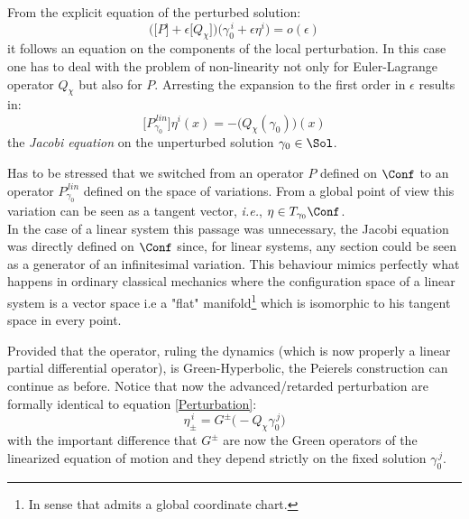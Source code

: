 \documentclass[Main]{subfiles}
\begin{document}
		\vspace{2mm}
		From the explicit equation of the perturbed solution: 
		\begin{displaymath}
			\biggr(\big[P\big] + \epsilon\big[Q_\chi\big] \biggr) \big(\gamma_0^{\,i}+\epsilon \eta^i \big) = o(\epsilon)
		\end{displaymath}
		it follows an equation on the components of the local perturbation.
		In  this case one has to deal with the problem of non-linearity not only for Euler-Lagrange operator $Q_\chi$ but also for $P$.
		Arresting the expansion to the first order in $\epsilon$ results in:
		\begin{equation}\label{PeierlJacobiEqNonLin}
			\biggr[P_{\gamma_0}^{\, lin} \biggr] \eta^i(x) = -\biggr(Q_\chi(\gamma_0)\biggr)(x)
		\end{equation}
		the \emph{Jacobi equation} on the unperturbed solution $\gamma_0\in \Sol$.

		\vspace{2mm}
			Has to be stressed that
			we switched from an operator $P$  defined on  $\Conf$ to an operator  $P_{\gamma_0}^{\, lin}  $ defined on the space of variations.
			From a global point of view this variation can be seen as a tangent vector, \textit{ i.e.}, $\eta \in T_{\gamma_0}\Conf$.\\
			In the case of a linear system this passage was unnecessary, the Jacobi equation was directly defined on $\Conf$ since, for linear systems, any section could be seen as a generator of an infinitesimal variation.
			This behaviour mimics perfectly what happens in ordinary classical mechanics where the configuration space of a linear system is a vector space i.e a "flat" manifold\footnote{In sense that admits a global coordinate chart.} which is isomorphic to his tangent space in every point.

		\vspace{2mm}	
		Provided that the %
		 operator, ruling the dynamics
		(which is now properly a linear partial differential operator), is Green-Hyperbolic, the Peierels construction can continue as before.
		Notice that now the advanced/retarded perturbation are formally identical to equation \ref{Perturbation}:
		\begin{displaymath}
			\eta_\pm^{\, i} = G^\pm \big( - Q_\chi \gamma_0^{\, j})
		\end{displaymath}
		with the important difference that $G^\pm$ are now the Green operators of the linearized %
		equation of motion
		and they depend strictly on the fixed solution $\gamma_0^{\, j}$.
		
\end{document}
